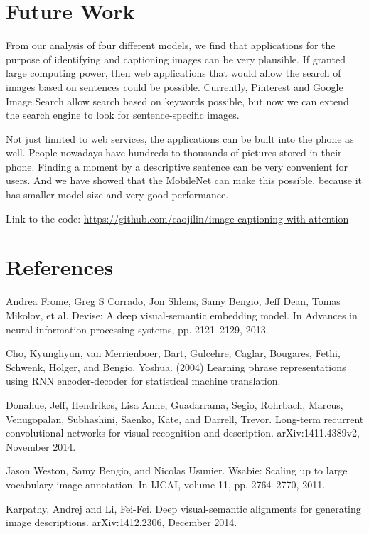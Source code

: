\documentclass{article}
\begin{document}
\section{Future Work}
\label{app}
From our analysis of four different models, we find that applications for the purpose of identifying and captioning images can be very plausible. If granted large computing power, then web applications that would allow the search of images based on sentences could be possible. Currently, Pinterest and Google Image Search allow search based on keywords possible, but now we can extend the search engine to look for sentence-specific images. 

Not just limited to web services, the applications can be built into the phone as well. People nowadays have hundreds to thousands of pictures stored in their phone. Finding a moment by a descriptive sentence can be very convenient for users. And we have showed that the MobileNet can make this possible, because it has smaller model size and very good performance. 

Link to the code: \href{https://github.com/caojilin/image-captioning-with-attention} {https://github.com/caojilin/image-captioning-with-attention}

\section*{References}
\small

Andrea Frome, Greg S Corrado, Jon Shlens, Samy Bengio, Jeff Dean, Tomas Mikolov, et al. Devise:
A deep visual-semantic embedding model. In Advances in neural information processing systems,
pp. 2121–2129, 2013.

Cho, Kyunghyun, van Merrienboer, Bart, Gulcehre, Caglar, Bougares, Fethi, Schwenk, Holger, and Bengio, Yoshua. (2004) Learning phrase representations using RNN encoder-decoder for statistical machine translation.

Donahue, Jeff, Hendrikcs, Lisa Anne, Guadarrama, Segio, Rohrbach, Marcus, Venugopalan, Subhashini, Saenko,
Kate, and Darrell, Trevor. Long-term recurrent convolutional networks for visual recognition and description.
arXiv:1411.4389v2, November 2014.

Jason Weston, Samy Bengio, and Nicolas Usunier. Wsabie: Scaling up to large vocabulary image
annotation. In IJCAI, volume 11, pp. 2764–2770, 2011.

Karpathy, Andrej and Li, Fei-Fei. Deep visual-semantic alignments for generating image descriptions. arXiv:1412.2306,
December 2014.
\end{document}
